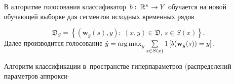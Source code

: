\begin{multicols}{2}
В алгоритме голосования классификатор~$b:\;\mathbb{R}^n\hm\to Y$ обучается на 
новой обучающей выборке для сегментов исходных временн$\acute{\mbox{ы}}$х рядов

\noindent
$$
\mathfrak{D}_S=\left\{(\mathbf{w}_g(s),y):\;(x,y)\in\mathfrak{D},\,s\in S(x)\right\}.
$$
Далее производится голосование
$\hat{y}\hm=\argmax_{y}\sum\limits_{s\in S(x)}1\left[b(\mathbf{w}_g(s))=y\right].$

Алгоритм классификации в~пространстве гиперпараметров 
(распределений параметров аппрокси-\linebreak\vspace*{-12pt}

\pagebreak

\end{multicols}

\begin{table*}\small %
\begin{center}
\parbox{396pt}{
\label{tbl:USCHAD_AR_FOURIER_confusion}
}

\vspace*{2ex}


\end{center}
\end{table*}
